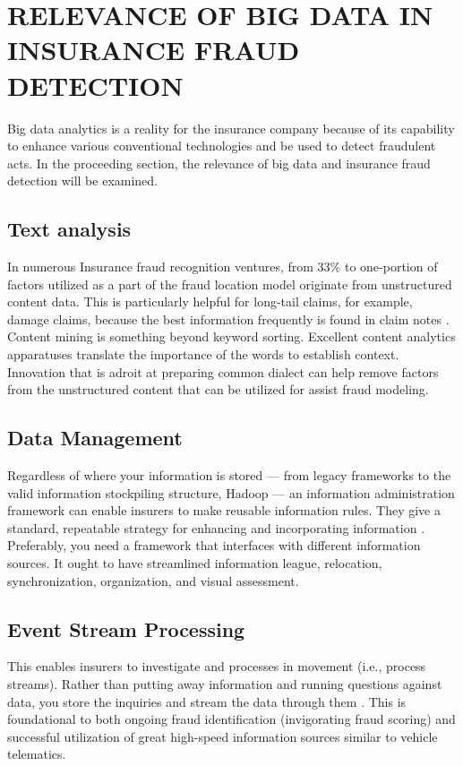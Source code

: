 \documentclass[sigconf]{acmart}
\begin{document}
\section{RELEVANCE OF BIG DATA IN INSURANCE FRAUD DETECTION}
Big data analytics is a reality for the insurance company because of its capability to enhance various conventional technologies and be used to detect fraudulent acts. In the proceeding section, the relevance of big data and insurance fraud detection will be examined.

\subsection{Text analysis}

In numerous Insurance fraud recognition ventures, from 33{\%} to one-portion of factors utilized as a part of the fraud location model originate from unstructured content data. This is particularly helpful for long-tail claims, for example, damage claims, because the best information frequently is found in claim notes \cite{4} . Content mining is something beyond keyword sorting. Excellent content analytics apparatuses translate the importance of the words to establish context. Innovation that is adroit at preparing common dialect can help remove factors from the unstructured content that can be utilized for assist fraud modeling.



\subsection{Data Management}

Regardless of where your information is stored — from legacy frameworks to the valid information stockpiling structure, Hadoop — an information administration framework can enable insurers to make reusable information rules. They give a standard, repeatable strategy for enhancing and incorporating information \cite{3}. Preferably, you need a framework that interfaces with different information sources. It ought to have streamlined information league, relocation, synchronization, organization, and visual assessment. 


\subsection{Event Stream Processing}

This enables insurers to investigate and processes in movement (i.e., process streams). Rather than putting away information and running questions against data, you store the inquiries and stream the data through them \cite{1}. This is foundational to both ongoing fraud identification (invigorating fraud scoring) and successful utilization of great high-speed information sources similar to vehicle telematics. 
\end{document}
